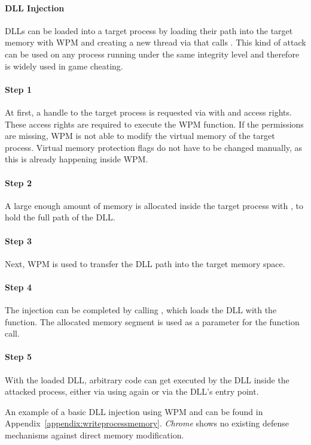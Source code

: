 \paragraph{ \gls{DLL} Injection}
\glspl{DLL} can be loaded into a target process by loading their path into the target memory with \gls{WPM} and creating a new thread via  that calls . This kind of attack can be used on any process running under the same integrity level and therefore is widely used in game cheating.

\paragraph{Step 1} 
At first, a handle to the target process is requested via  with  and  access rights. These access rights are required to execute the \gls{WPM} function. If the permissions are missing, \gls{WPM} is not able to modify the virtual memory of the target process. Virtual memory protection flags do not have to be changed manually, as this is already happening inside \gls{WPM}. 

\paragraph{Step 2} 
A large enough amount of memory is allocated inside the target process with , to hold the full path of the \gls{DLL}. 

\paragraph{Step 3}
Next, \gls{WPM} is used to transfer the \gls{DLL} path into the target memory space.

\paragraph{Step 4}
The injection can be completed by calling , which loads the \gls{DLL} with the  function. The allocated memory segment is used as a parameter for the  function call. 

\paragraph{Step 5}
With the loaded \gls{DLL}, arbitrary code can get executed by the \gls{DLL} inside the attacked process, either via using  again or via the \gls{DLL}'s entry point.


An example of a basic \gls{DLL} injection using \gls{WPM} and  can be found in Appendix~\ref{appendix:writeprocessmemory}. \emph{Chrome} shows no existing defense mechanisms against direct memory modification.